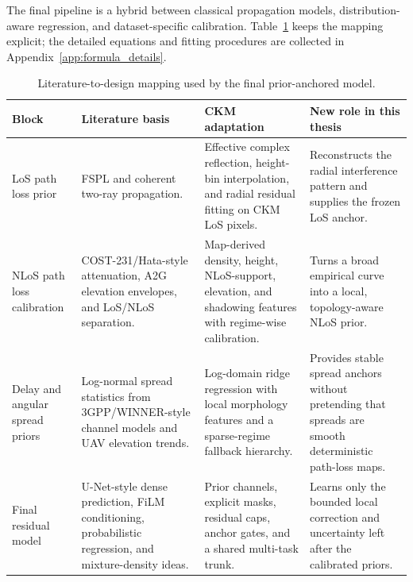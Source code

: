 The final pipeline is a hybrid between classical propagation models,
distribution-aware regression, and dataset-specific calibration.
Table~\ref{tab:prior_literature_mapping} keeps the mapping explicit; the
detailed equations and fitting procedures are collected in
Appendix~\ref{app:formula_details}.

\begin{table}[H]
\centering
\caption{Literature-to-design mapping used by the final prior-anchored model.}
\label{tab:prior_literature_mapping}
\scriptsize
\renewcommand{\arraystretch}{1.12}
\begin{tabularx}{\textwidth}{>{\raggedright\arraybackslash}p{}
>{\raggedright\arraybackslash}X
>{\raggedright\arraybackslash}X
>{\raggedright\arraybackslash}X}
\toprule
Block & Literature basis & CKM adaptation & New role in this thesis \\
\midrule
LoS path loss prior &
FSPL and coherent two-ray propagation. &
Effective complex reflection, height-bin interpolation, and radial residual
fitting on CKM LoS pixels. &
Reconstructs the radial interference pattern and supplies the frozen LoS
anchor. \\
NLoS path loss calibration &
COST-231/Hata-style attenuation, A2G elevation envelopes, and LoS/NLoS
separation. &
Map-derived density, height, NLoS-support, elevation, and shadowing features
with regime-wise calibration. &
Turns a broad empirical curve into a local, topology-aware NLoS prior. \\
Delay and angular spread priors &
Log-normal spread statistics from 3GPP/WINNER-style channel models and UAV
elevation trends. &
Log-domain ridge regression with local morphology features and a sparse-regime
fallback hierarchy. &
Provides stable spread anchors without pretending that spreads are smooth
deterministic path-loss maps. \\
Final residual model &
U-Net-style dense prediction, FiLM conditioning, probabilistic regression, and
mixture-density ideas. &
Prior channels, explicit masks, residual caps, anchor gates, and a shared
multi-task trunk. &
Learns only the bounded local correction and uncertainty left after the
calibrated priors. \\
\bottomrule
\end{tabularx}
\end{table}
